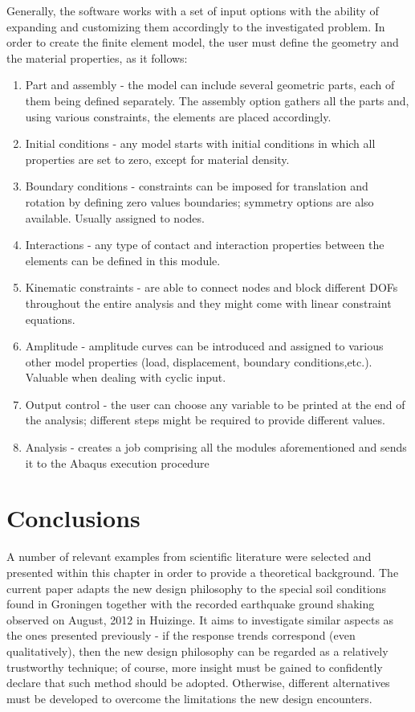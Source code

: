 \documentclass[12pt,a4paper]{report}
\begin{document}
Generally, the software works with a set of input options with the ability of expanding and customizing them accordingly to the investigated problem. In order to create the finite element model, the user must define the geometry and the material properties, as it follows:
\begin{enumerate}
	\item Part and assembly - the model can include several geometric parts, each of them being defined separately. The assembly option gathers all the parts and, using various constraints, the elements are placed accordingly.
	\item Initial conditions - any model starts with initial conditions in which all properties are set to zero, except for material density.  
	\item Boundary conditions - constraints can be imposed for translation and rotation by defining zero values boundaries; symmetry options are also available. Usually assigned to nodes.
	\item Interactions - any type of contact and interaction properties between the elements can be defined in this module.
	\item Kinematic constraints - are able to connect nodes and block different DOFs throughout the entire analysis and they might come with linear constraint equations. 
	\item Amplitude - amplitude curves can be introduced and assigned to various other model properties (load, displacement, boundary conditions,etc.). Valuable when dealing with cyclic input.
	\item Output control - the user can choose any variable to be printed at the end of the analysis; different steps might be required to provide different values. 
	\item Analysis - creates a job comprising all the modules aforementioned and sends it to the Abaqus execution procedure 
\end{enumerate} 

\section{Conclusions}
A number of relevant examples from scientific literature were selected and presented within this chapter in order to provide a theoretical background. The current paper adapts the new design philosophy to the special soil conditions found in Groningen together with the recorded earthquake ground shaking observed on August, 2012 in Huizinge. It aims to investigate similar aspects as the ones presented previously - if the response trends correspond (even qualitatively), then the new design philosophy can be regarded as a relatively trustworthy technique; of course, more insight must be gained to confidently declare that such method should be adopted. Otherwise, different alternatives must be developed to overcome the limitations the new design encounters.
\end{document}
